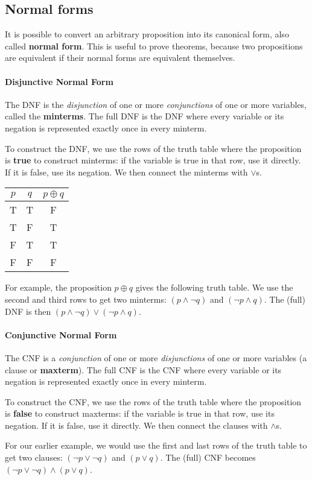 \documentclass[10pt,a4paper]{book}
\begin{document}
\subsection{Normal forms}
It is possible to convert an arbitrary proposition into its canonical form, also called \textbf{normal form}. This is useful to prove theorems, because two propositions are equivalent if their normal forms are equivalent themselves.
\paragraph*{Disjunctive Normal Form}
The DNF is the \textit{disjunction} of one or more \textit{conjunctions} of one or more variables, called the \textbf{minterms}. The full DNF is the DNF where every variable or its negation is represented exactly once in every minterm.\par 
To construct the DNF, we use the rows of the truth table where the proposition is \textbf{true} to construct minterms: if the variable is true in that row, use it directly. If it is false, use its negation. We then connect the minterms with $\lor$s.\par 
\begin{tabular}{ |c  c | c| }
\hline
 $p$ & $q$ & $p\oplus q$\\
 \hline
 T & T & F \\ 
 T & F & T \\  
 F & T & T \\
 F & F & F \\
 \hline
\end{tabular}
For example, the proposition $p\oplus q$ gives the following truth table. We use the second and third rows to get two minterms: $(p\land\neg q)$ and $(\neg p\land q)$. The (full) DNF is then $(p\land\neg q)\lor(\neg p\land q)$.
\paragraph*{Conjunctive Normal Form}
The CNF is a \textit{conjunction} of one or more \textit{disjunctions} of one or more variables (a clause or \textbf{maxterm}). The full CNF is the CNF where every variable or its negation is represented exactly once in every minterm.\par
To construct the CNF, we use the rows of the truth table where the proposition is \textbf{false} to construct maxterms: if the variable is true in that row, use its negation. If it is false, use it directly. We then connect the clauses with $\land$s.\par 
For our earlier example, we would use the first and last rows of the truth table to get two clauses: $(\neg p\lor\neg q)$ and $(p\lor q)$. The (full) CNF becomes $(\neg p\lor\neg q)\land(p\lor q)$.
\end{document}
